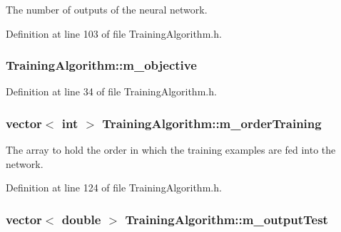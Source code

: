 The number of outputs of the neural network. 



Definition at line 103 of file Training\+Algorithm.\+h.

\subsubsection[{\texorpdfstring{m\+\_\+objective}{m_objective}}]{ Training\+Algorithm\+::m\+\_\+objective\hspace{0.3cm}{\ttfamily [private]}}\hypertarget{classTrainingAlgorithm_af9cc77a25cd1c116fb12f89a04d704a6}{}\label{classTrainingAlgorithm_af9cc77a25cd1c116fb12f89a04d704a6}


Definition at line 34 of file Training\+Algorithm.\+h.

\subsubsection[{\texorpdfstring{m\+\_\+order\+Training}{m_orderTraining}}]{\setlength{\rightskip}{0pt plus 5cm}vector$<$ int $>$ Training\+Algorithm\+::m\+\_\+order\+Training\hspace{0.3cm}{\ttfamily [private]}}\hypertarget{classTrainingAlgorithm_acde0233f75f362afcd56890bd9cf3552}{}\label{classTrainingAlgorithm_acde0233f75f362afcd56890bd9cf3552}


The array to hold the order in which the training examples are fed into the network. 



Definition at line 124 of file Training\+Algorithm.\+h.

\subsubsection[{\texorpdfstring{m\+\_\+output\+Test}{m_outputTest}}]{\setlength{\rightskip}{0pt plus 5cm}vector$<$ double $>$ Training\+Algorithm\+::m\+\_\+output\+Test\hspace{0.3cm}{\ttfamily [private]}}\hypertarget{classTrainingAlgorithm_a1e91ea3d8b4285bab8c6dcbb4e9d89b2}{}\label{classTrainingAlgorithm_a1e91ea3d8b4285bab8c6dcbb4e9d89b2}


